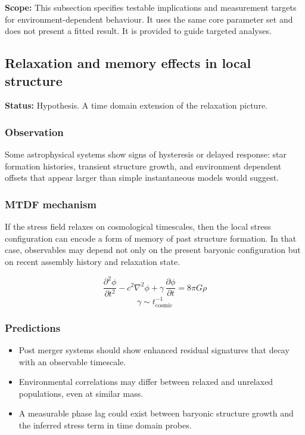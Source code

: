 \documentclass[11pt,a4paper]{article}
\begin{document}
\begin{mdframed}[linecolor=accent,linewidth=0.5pt,backgroundcolor=callout-bg,leftline=true,rightline=true,topline=true,bottomline=true,innerleftmargin=8pt,innerrightmargin=8pt,innertopmargin=6pt,innerbottommargin=6pt]
\textbf{Scope:} This subsection specifies testable implications and measurement targets for environment-dependent behaviour. It uses the same core parameter set and does not present a fitted result. It is provided to guide targeted analyses.
\end{mdframed}

\subsection{Relaxation and memory effects in local structure}
\begin{mdframed}[linecolor=accent,linewidth=0.5pt,backgroundcolor=callout-bg,leftline=true,rightline=true,topline=true,bottomline=true,innerleftmargin=8pt,innerrightmargin=8pt,innertopmargin=6pt,innerbottommargin=6pt]
\textbf{Status:} Hypothesis. A time domain extension of the relaxation picture.
\end{mdframed}

\subsubsection{Observation}
Some astrophysical systems show signs of hysteresis or delayed response: star formation histories, transient structure growth, and environment dependent offsets that appear larger than simple instantaneous models would suggest.

\subsubsection{MTDF mechanism}
If the stress field relaxes on cosmological timescales, then the local stress configuration can encode a form of memory of past structure formation. In that case, observables may depend not only on the present baryonic configuration but on recent assembly history and relaxation state.

$$
\frac{\partial^2 \phi}{\partial t^2} - c^2\nabla^2\phi + \gamma\,\frac{\partial \phi}{\partial t} = 8\pi G\rho
$$
$$
\gamma \sim t_{\mathrm{cosmic}}^{-1}
$$

\subsubsection{Predictions}
\begin{itemize}
  \item Post merger systems should show enhanced residual signatures that decay with an observable timescale.
  \item Environmental correlations may differ between relaxed and unrelaxed populations, even at similar mass.
  \item A measurable phase lag could exist between baryonic structure growth and the inferred stress term in time domain probes.
\end{itemize}
\end{document}
